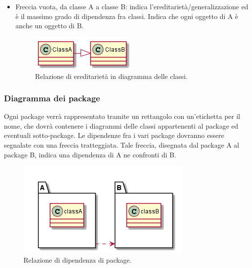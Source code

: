 \documentclass[NormeDiProgetto.tex]{subfiles}
\begin{document}
\begin{itemize}
	\item Freccia vuota, da classe A a classe B: indica l'ereditarietà/generalizzazione ed è il massimo grado di dipendenza fra classi. Indica che ogni oggetto di A è anche un oggetto di B.
	\begin{figure}[h]
		\centering
		\includegraphics[width=0.4\linewidth]{progettazione/ered}
		\caption{Relazione di ereditarietà in diagramma delle classi.}
		\label{fig:ered}
	\end{figure}
	
\end{itemize}
\newpage
\subsubsection{Diagramma dei package}
Ogni package verrà rappresentato tramite un rettangolo con un'etichetta per il nome, che dovrà contenere i diagrammi delle classi appartenenti al package ed eventuali sotto-package. Le dipendenze fra i vari package dovranno essere segnalate con una freccia tratteggiata. Tale freccia, disegnata dal package A al package B, indica una dipendenza di A ne confronti di B.
\begin{figure}[h]
	\centering
	\includegraphics[width=0.4\linewidth]{progettazione/package}
	\caption{Relazione di dipendenza di package.}
	\label{fig:package}
\end{figure}
\end{document}
